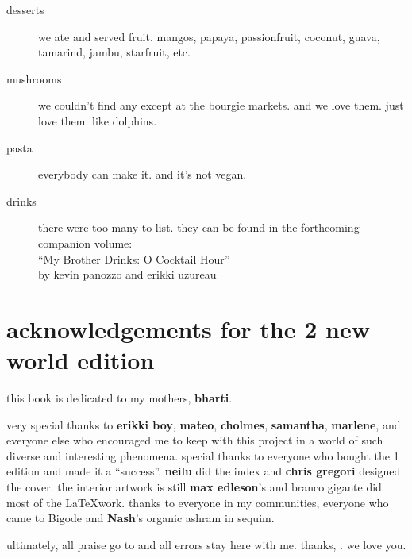 \begin{description}

  \item[desserts] we ate and served fruit.  mangos, papaya,
  passionfruit, coconut, guava, tamarind, jambu, starfruit, etc.

  \item[mushrooms] we couldn't find any except at the bourgie
  markets. and we love them. just love them. like dolphins.

  \item[pasta] everybody can make it. and it's not vegan.

  \item[drinks] there were too many to list. they can be found in the
  forthcoming companion volume:\\``My Brother Drinks: O  Cocktail
  Hour''\\by kevin panozzo and erikki uzureau

\end{description}

\pagebreak

\section{acknowledgements for the 2 new world edition}

this book is dedicated to my mothers, \textbf{bharti}.

very special thanks to \textbf{erikki boy}, \textbf{mateo}, \textbf{cholmes}, \textbf{samantha}, \textbf{marlene}, and everyone else who encouraged me to keep with this project in a world of such diverse and interesting phenomena. special thanks to everyone who bought the 1 edition and made it a "`success"'. \textbf{neilu} did the index and \textbf{chris gregori} designed the cover. the interior artwork is still \textbf{max edleson}'s and branco gigante did most of the \LaTeX work. thanks to everyone in my communities, everyone who came to Bigode and \textbf{Nash}'s organic ashram in sequim.

ultimately, all praise go to \textbf{} and all errors stay here with me. thanks, . we love you.
